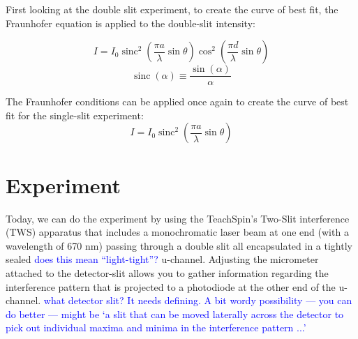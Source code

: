 \documentclass[prb,preprint]{revtex4-1}
\DeclareMathOperator{\sinc}{sinc}
\begin{document}
First looking at the double slit experiment, to create the curve of best fit, the Fraunhofer equation is applied to the double-slit intensity: 

\begin{equation}
I=I_0 \sinc^2{\left(\frac{\pi a}{\lambda}\sin{\theta}\right)}  \cos^2{\left(\frac{\pi d}{\lambda} \sin \theta\right)}
\label{eq1}
\end{equation}
\begin{equation*}
\sinc(\alpha) \equiv \frac{\sin(\alpha)}{\alpha}
\end{equation*}

The Fraunhofer conditions can be applied once again to create  the curve of best fit for the single-slit experiment: 
\begin{equation}
I=I_0 \sinc^2 \left(\frac{\pi a}{\lambda} \sin\theta \right)
\label{eq2}
\end{equation}



\section{Experiment}

Today, we can do the experiment by using the TeachSpin's Two-Slit interference (TWS) apparatus that includes a monochromatic laser beam at one end (with a wavelength of 670 nm) passing through a double slit all encapsulated in a tightly sealed \textcolor{blue}{does this mean ``light-tight''?} u-channel. Adjusting the micrometer attached to the detector-slit allows you to gather information regarding the interference pattern that is projected to a photodiode at the other end of the u-channel. \textcolor{blue}{what detector slit? It needs defining. A bit wordy possibility --- you can do better --- might be `a slit that can be moved laterally across the detector to pick out individual maxima and minima in the interference pattern ...'}
\end{document}
